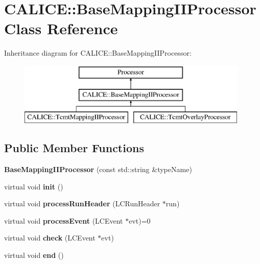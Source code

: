 \section{C\-A\-L\-I\-C\-E\-:\-:Base\-Mapping\-I\-I\-Processor Class Reference}
\label{classCALICE_1_1BaseMappingIIProcessor}
Inheritance diagram for C\-A\-L\-I\-C\-E\-:\-:Base\-Mapping\-I\-I\-Processor\-:\begin{figure}[H]
\begin{center}
\leavevmode
\includegraphics[height=3.000000cm]{classCALICE_1_1BaseMappingIIProcessor}
\end{center}
\end{figure}
\subsection*{Public Member Functions}
\begin{DoxyCompactItemize}
\item 
{\bfseries Base\-Mapping\-I\-I\-Processor} (const std\-::string \&type\-Name)\label{classCALICE_1_1BaseMappingIIProcessor_a8fe56d91380e26a12371e14a323d25d6}

\item 
virtual void {\bfseries init} ()\label{classCALICE_1_1BaseMappingIIProcessor_abb1ef572435bcc64898506d8f4c96cd9}

\item 
virtual void {\bfseries process\-Run\-Header} (L\-C\-Run\-Header $\ast$run)\label{classCALICE_1_1BaseMappingIIProcessor_a995afff29900be06e93ebe0453ed4aa6}

\item 
virtual void {\bfseries process\-Event} (L\-C\-Event $\ast$evt)=0\label{classCALICE_1_1BaseMappingIIProcessor_a5ac01e2e7f361f7ec4e1bd039ccbd33b}

\item 
virtual void {\bfseries check} (L\-C\-Event $\ast$evt)\label{classCALICE_1_1BaseMappingIIProcessor_a4abb713a96256ee6599e9737e54bdfe1}

\item 
virtual void {\bfseries end} ()\label{classCALICE_1_1BaseMappingIIProcessor_a201450aeeedac3600901e6fd1d25ada6}

\end{DoxyCompactItemize}
